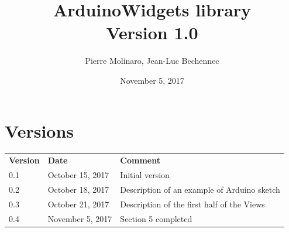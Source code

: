 \documentclass[a4paper,11pt]{extarticle}
\begin{document}
 


\title{\bf \Huge{ArduinoWidgets library\\Version 1.0}}
\author{Pierre Molinaro, Jean-Luc Bechennec}
\date {November 5, 2017}

\maketitle


\tableofcontents
\listoffigures


\section{Versions}
  \begin{tabular}{llp{10.5cm}}
    \textbf{Version} & \textbf{Date} & \textbf{Comment}\\
    0.1 & October 15, 2017 & Initial version \\
    0.2 & October 18, 2017 & Description of an example of Arduino sketch \\
    0.3 & October 21, 2017 & Description of the first half of the Views\\
    0.4 & November 5, 2017 & Section 5 completed
    


  \end{tabular}
\end{document}
